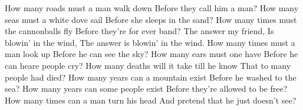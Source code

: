 \beginverse
How many roads must a man walk down
Before they call him a man?
How many seas must a white dove sail
Before she sleeps in the sand?
How many times must the cannonballs fly
Before they're for ever band?
\endverse
\beginchorus
The answer my friend,
Is blowin' in the wind,
The answer is blowin' in the wind.
\endchorus
\beginverse
How many times must a man look up
Before he can see the sky?
How many ears must one have
Before he can heare people cry?
How many deaths will it take till he know
That to many people had died?
\endverse
\beginverse
How many years can a mountain exist
Before he washed to the sea?
How many years can some people exist
Before they're allowed to be free?
How many times can a man turn his head
And pretend that he just doesn't see?
\endverse
\endsong